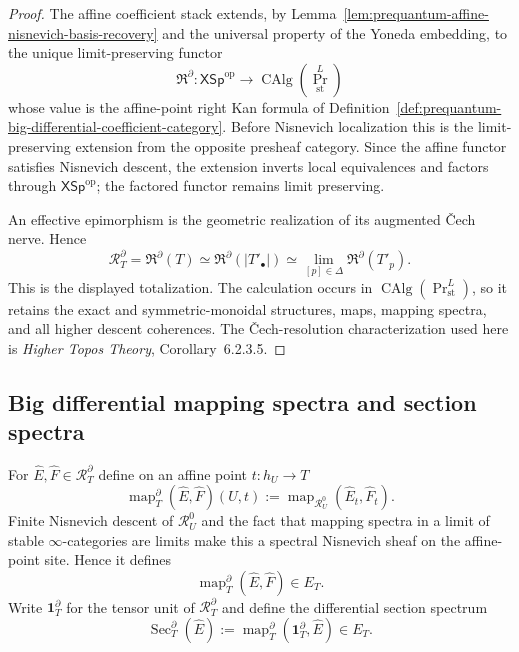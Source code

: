 \begin{proof}
The affine coefficient stack extends, by
Lemma~\ref{lem:prequantum-affine-nisnevich-basis-recovery} and the universal
property of the Yoneda embedding, to the unique limit-preserving functor
\[
\mathfrak R^{\partial}:
\mathsf{XSp}^{\mathrm{op}}
\longrightarrow
\operatorname{CAlg}(\operatorname{Pr}^{L}_{\mathrm{st}})
\]
whose value is the affine-point right Kan formula of
Definition~\ref{def:prequantum-big-differential-coefficient-category}.  Before
Nisnevich localization this is the limit-preserving extension from the opposite
presheaf category.  Since the affine functor satisfies Nisnevich descent, the
extension inverts local equivalences and factors through
$\mathsf{XSp}^{\mathrm{op}}$; the factored functor remains limit preserving.

An effective epimorphism is the geometric realization of its augmented
\v{C}ech nerve.  Hence
\[
\mathcal R_T^{\partial}
=\mathfrak R^{\partial}(T)
\simeq
\mathfrak R^{\partial}(|T'_\bullet|)
\simeq
\lim_{[p]\in\Delta}\mathfrak R^{\partial}(T'_p).
\]
This is the displayed totalization.  The calculation occurs in
$\operatorname{CAlg}(\operatorname{Pr}^{L}_{\mathrm{st}})$, so it retains the
exact and symmetric-monoidal structures, maps, mapping spectra, and all higher
descent coherences.  The \v{C}ech-resolution characterization used here is
\emph{Higher Topos Theory}, Corollary~6.2.3.5.
\end{proof}

\subsection{Big differential mapping spectra and section spectra}
\label{subsec:prequantum-big-differential-mapping-spectra}

\begin{construction}
\label{constr:prequantum-big-differential-mapping-spectrum}
For $\widehat E,\widehat F\in\mathcal R_T^{\partial}$ define on an affine point
$t:h_U\to T$
\[
\operatorname{map}^{\partial}_T(\widehat E,\widehat F)(U,t)
:=
\operatorname{map}_{\mathcal R_U^0}(\widehat E_t,\widehat F_t).
\]
Finite Nisnevich descent of $\mathcal R_U^0$ and the fact that mapping spectra in
a limit of stable $\infty$-categories are limits make this a spectral Nisnevich
sheaf on the affine-point site.  Hence it defines
\[
\boxed{
\operatorname{map}^{\partial}_T(\widehat E,\widehat F)\in E_T.
}
\]
Write $\mathbf1_T^{\partial}$ for the tensor unit of
$\mathcal R_T^{\partial}$ and define the differential section spectrum
\[
\boxed{
\operatorname{Sec}^{\partial}_T(\widehat E)
:=
\operatorname{map}^{\partial}_T
(\mathbf1_T^{\partial},\widehat E)\in E_T.
}
\]
\end{construction}

